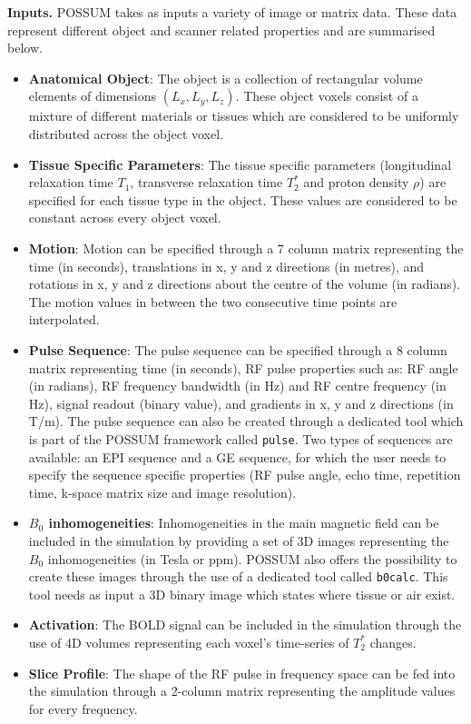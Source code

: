 \textbf{Inputs.} POSSUM takes as inputs a variety of image or matrix data.
These data represent different object and scanner related properties and are summarised below.
\begin{itemize}
    
    \item \textbf{Anatomical Object}: The object is a collection of rectangular volume elements of dimensions $(L_x, L_y, L_z)$.
    These object voxels consist of a mixture of different materials or tissues which are considered to be uniformly distributed across the object voxel.
    
    \item \textbf{Tissue Specific Parameters}: The tissue specific parameters (longitudinal relaxation time $T_1$, transverse relaxation time $T_2^*$ and proton density $\rho$) are specified for each tissue type in the object.
    These values are considered to be constant across every object voxel.
    
    \item \textbf{Motion}: Motion can be specified through a 7 column matrix representing the time (in seconds), translations in x, y and z directions (in metres), and rotations in x, y and z directions about the centre of the volume (in radians).
    The motion values in between the two consecutive time points are interpolated.
    
    \item \textbf{Pulse Sequence}: The pulse sequence can be specified through a 8 column matrix representing time (in seconds), RF pulse properties such as: RF angle (in radians), RF frequency bandwidth (in Hz) and RF centre frequency (in Hz), signal readout (binary value), and gradients in x, y and z directions (in T/m).
    The pulse sequence can also be created through a dedicated tool which is part of the POSSUM framework called \texttt{pulse}.
    Two types of sequences are available: an EPI sequence and a GE sequence, for which the user needs to specify the sequence specific properties (RF pulse angle, echo time, repetition time, k-space matrix size and image resolution).
    
    \item \textbf{$B_0$ inhomogeneities}: Inhomogeneities in the main magnetic field can be included in the simulation by providing a set of 3D images representing the $B_0$ inhomogeneities (in Tesla or ppm).
    POSSUM also offers the possibility to create these images through the use of a dedicated tool called \texttt{b0calc}.
    This tool needs as input a 3D binary image which states where tissue or air exist.
    
    \item \textbf{Activation}: The BOLD signal can be included in the simulation through the use of 4D volumes representing each voxel's time-series of $T_2^*$ changes.
    
    \item \textbf{Slice Profile}: The shape of the RF pulse in frequency space can be fed into the simulation through a 2-column matrix representing the amplitude values for every frequency.
    
\end{itemize}


